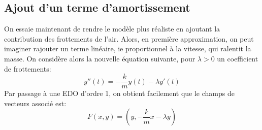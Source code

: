    \subsection{Ajout d'un terme d'amortissement}
      On essaie maintenant de rendre le modèle plus réaliste en ajoutant la contribution des frottements de l'air. Alors, en première approximation, on peut imaginer rajouter un terme linéaire, ie proportionnel à la vitesse, qui ralentit la masse. On considère alors la nouvelle équation suivante, pour \(\lambda > 0\) un coefficient de frottements:
      \[
         y''(t) = -\frac{k}{m}y(t) - \lambda y'(t)
      \]
      Par passage à une EDO d'ordre 1, on obtient facilement que le champs de vecteurs associé est:
      \[ 
         F(x, y) = \left(y, - \frac{k}{m}x - \lambda y \right)
      \]
      \pagebreak


